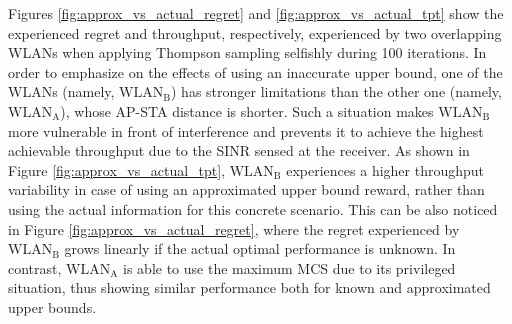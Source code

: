 \documentclass{article}
\begin{document}
Figures \ref{fig:approx_vs_actual_regret} and \ref{fig:approx_vs_actual_tpt} show the experienced regret and throughput, respectively, experienced by two overlapping WLANs when applying Thompson sampling selfishly during 100 iterations. In order to emphasize on the effects of using an inaccurate upper bound, one of the WLANs (namely, $\text{WLAN}_\text{B}$) has stronger limitations than the other one (namely, $\text{WLAN}_\text{A}$), whose AP-STA distance is shorter. Such a situation makes $\text{WLAN}_\text{B}$ more vulnerable in front of interference and prevents it to achieve the highest achievable throughput due to the SINR sensed at the receiver. As shown in Figure \ref{fig:approx_vs_actual_tpt}, $\text{WLAN}_\text{B}$ experiences a higher throughput variability in case of using an approximated upper bound reward, rather than using the actual information for this concrete scenario. This can be also noticed in Figure \ref{fig:approx_vs_actual_regret}, where the regret experienced by $\text{WLAN}_\text{B}$ grows linearly if the actual optimal performance is unknown. In contrast, $\text{WLAN}_\text{A}$ is able to use the maximum MCS due to its privileged situation, thus showing similar performance both for known and approximated upper bounds.
\end{document}
